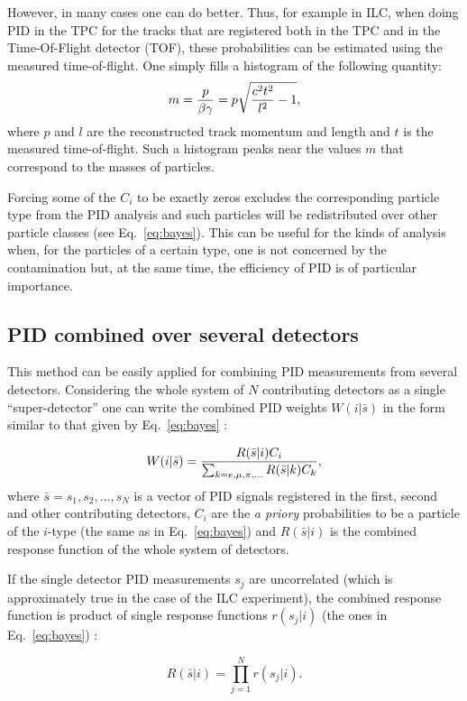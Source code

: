 \documentclass[12pt,a4paper,twoside]{article}
\begin{document}
{However, in many cases one can do better. Thus, for example in ILC, 
when doing 
PID in the TPC for the tracks that are registered both in the TPC and 
in the Time-Of-Flight detector (TOF), these probabilities
can be estimated using the measured time-of-flight.  One simply fills a
histogram of the following quantity:
\begin{equation}
m={p\over {\beta\gamma}}=p\sqrt{{{c^2t^2}\over{l^2}} - 1},
\end{equation}
where $p$ and $l$ are the reconstructed track momentum and length and $t$
is the measured time-of-flight. Such a histogram peaks near the values
$m$ that correspond to the masses of particles.

Forcing some of the $C_i$ to be exactly zeros excludes the 
corresponding particle type from the PID analysis and such particles will 
be redistributed over other particle classes (see Eq.~\ref{eq:bayes}).
This can be useful for the kinds of analysis when, for the particles 
of a certain type, one is not concerned by
the contamination but, at the same time, the efficiency of PID is
of particular importance.


\subsection{PID combined over several detectors}
This method can be easily applied for combining PID measurements
from several detectors. Considering the whole system of $N$ contributing 
detectors as a single ``super-detector'' one can write the combined
PID weights $W(i|\bar{s})$ in the form similar to that given by 
Eq.~\ref{eq:bayes} :

\begin{equation}\label{eq:bayes1}
  W(i|\bar{s})={R(\bar{s}|i) C_i \over \sum_{k=e, \mu, \pi,
  ...}{R(\bar{s}|k) C_k}} ,
\end{equation}
where $\bar{s}={s_1, s_2, ..., s_N}$ is a vector of PID signals registered in 
the first, second and other contributing detectors,
$C_i$ are the {\it a priory} probabilities to be a particle of the $i$-type
(the same as in Eq.~\ref{eq:bayes}) and
$R(\bar{s}|i)$ is the combined response function of the whole system
of detectors. 

If the single detector PID measurements $s_j$ are uncorrelated (which is 
approximately true in the case of the ILC experiment), the
combined response function is product of single response functions
$r(s_j|i)$ (the ones in Eq.~\ref{eq:bayes}) :

\begin{equation}\label{eq:resp}
  R(\bar{s}|i)=\prod_{j=1}^{N}r(s_j|i).
\end{equation}

}
\end{document}
